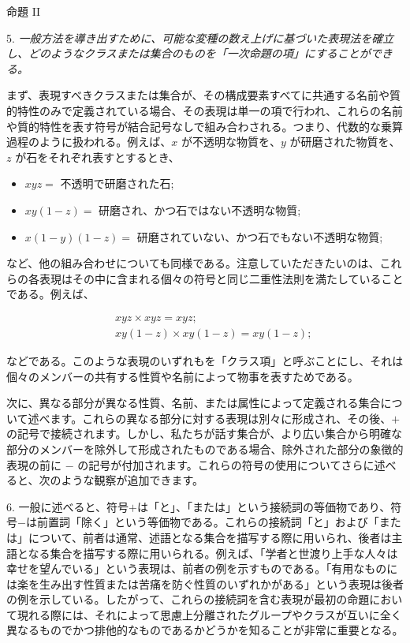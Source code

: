 \documentclass[a4paper,11pt,openany]{ltjsbook}
\begin{document}
\centerline{\textsc{命題 II}}

5. \textit{一般方法を導き出すために、可能な変種の数え上げに基づいた表現法を確立し、どのようなクラスまたは集合のものを「一次命題の項」にすることができる。}

まず、表現すべきクラスまたは集合が、その構成要素すべてに共通する名前や質的特性のみで定義されている場合、その表現は単一の項で行われ、これらの名前や質的特性を表す符号が結合記号なしで組み合わされる。つまり、代数的な乗算過程のように扱われる。例えば、$x$ が不透明な物質を、$y$ が研磨された物質を、$z$ が石をそれぞれ表すとするとき、

\begin{itemize}
\item[] $xyz = $ 不透明で研磨された石;
\item[] $xy (1 - z) = $ 研磨され、かつ石ではない不透明な物質;
\item[] $x (1 - y)(1 - z) = $ 研磨されていない、かつ石でもない不透明な物質;
\end{itemize}

など、他の組み合わせについても同様である。注意していただきたいのは、これらの各表現はその中に含まれる個々の符号と同じ二重性法則を満たしていることである。例えば、

\begin{eqnarray*}
&&xyz \times xyz = xyz;\\
&&xy (1 - z) \times xy (1 - z) = xy (1 - z);
\end{eqnarray*}

などである。このような表現のいずれもを「クラス項」と呼ぶことにし、それは個々のメンバーの共有する性質や名前によって物事を表すためである。

次に、異なる部分が異なる性質、名前、または属性によって定義される集合について述べます。これらの異なる部分に対する表現は別々に形成され、その後、$+$ の記号で接続されます。しかし、私たちが話す集合が、より広い集合から明確な部分のメンバーを除外して形成されたものである場合、除外された部分の象徴的表現の前に $-$ の記号が付加されます。これらの符号の使用についてさらに述べると、次のような観察が追加できます。

6. 一般に述べると、符号$+$は「と」、「または」という接続詞の等価物であり、符号$-$は前置詞「除く」という等価物である。これらの接続詞「と」および「または」について、前者は通常、述語となる集合を描写する際に用いられ、後者は主語となる集合を描写する際に用いられる。例えば、「学者と世渡り上手な人々は幸せを望んでいる」という表現は、前者の例を示すものである。「有用なものには楽を生み出す性質または苦痛を防ぐ性質のいずれかがある」という表現は後者の例を示している。したがって、これらの接続詞を含む表現が最初の命題において現れる際には、それによって思慮上分離されたグループやクラスが互いに全く異なるものでかつ排他的なものであるかどうかを知ることが非常に重要となる。
\end{document}
